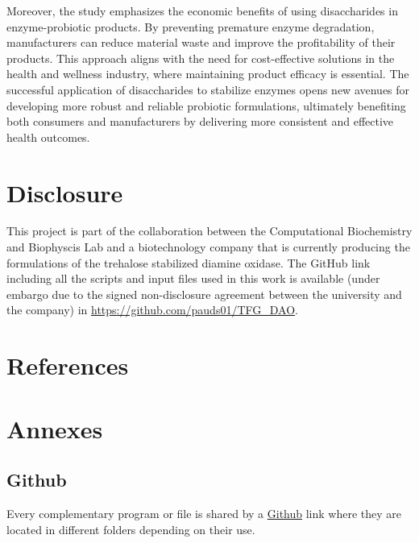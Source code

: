 \documentclass[12pt,twoside]{article}
\begin{document}
Moreover, the study emphasizes the economic benefits of using disaccharides in enzyme-probiotic products. By preventing premature enzyme degradation, manufacturers can reduce material waste and improve the profitability of their products. This approach aligns with the need for cost-effective solutions in the health and wellness industry, where maintaining product efficacy is essential. The successful application of disaccharides to stabilize enzymes opens new avenues for developing more robust and reliable probiotic formulations, ultimately benefiting both consumers and manufacturers by delivering more consistent and effective health outcomes.

\section{Disclosure}

This project is part of the collaboration between the Computational Biochemistry and Biophyscis Lab and a biotechnology company that is currently producing the formulations of the trehalose stabilized diamine oxidase. The GitHub link including all the scripts and input files used in this work is available (under embargo due to the signed non-disclosure agreement between the university and the company) in \url{https://github.com/pauds01/TFG_DAO}. 

\clearpage
\section{References}




\nocite{aduri_amber_2007}
\nocite{zuegg_molecular_2000}
\nocite{chong_protein-protein_2021}
\nocite{bryce_carbohydrate-protein_2001}
\nocite{king_molecular_2019}
\nocite{bohne-lang_glyprot_2005}
\nocite{bohm_glycosciencesdb_2019}
\nocite{floris_copper_2009}
\nocite{mcgrath_structure_2009}
\nocite{bohne-lang_glyprot_2005}
\nocite{danne_doglycanstools_2017}
\nocite{zhang_combination_2021}
\nocite{wu_variation_2021}
\nocite{wood1984spelunking}
\nocite{whitmore_constructing_2020}
\nocite{wells_mapping_2002}
\section{Annexes}
\subsection{Github}
\label{sub:github}
Every complementary program or file is shared by a \href{https://github.com/pauds01/TFG_DAO}{Github} link where they are located in different folders depending on their use.
\end{document}
